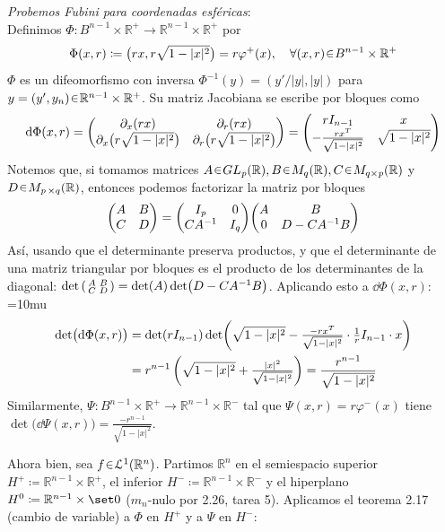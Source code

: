\begin{sol}
\vspace{1em}
\noindent\emph{Probemos Fubini para coordenadas esféricas}:\\
Definimos \(\Phi: B^{n-1} \times \mathbb{R}^+ \to \mathbb{R}^{n-1}\times\mathbb{R}^+\) por
\[
\Phi(x,r) \coloneq \bigl(rx, r\sqrt{1-|x|^2}\bigr) = r\varphi^+(x), \quad \forall (x,r) \en B^{n-1}\times\mathbb{R}^+
\]
\(\Phi\) es un difeomorfismo con inversa \(\Phi^{-1}(y) = (y'/|y|, |y|)\) para \(y=(y',y_n) \en \mathbb{R}^{n-1}\times\mathbb{R}^+\). 
Su matriz Jacobiana se escribe por bloques como
\[
\dd{\Phi(x,r)}
= \mqty(\partial_x(rx) & \partial_r(rx) \\ \partial_x\bigl(r\sqrt{1-|x|^2}\bigr) & \partial_r\bigl(r\sqrt{1-|x|^2}\bigr))
= \mqty(
r I_{n-1} & x \\
-\frac{r x^T}{\sqrt{1-|x|^2}} & \sqrt{1-|x|^2}
)
\]
Notemos que, si tomamos matrices $A\en GL_{\p}(\mathbb{R}), B\en M_{q}(\mathbb{R}), C \en M_{q \times\p}(\mathbb{R})$ y $D\en M_{\p\times q}(\mathbb{R})$, entonces podemos factorizar la matriz por bloques 
\[
\mqty(A&B\\C&D)%
= \mqty(I_{\p}&0\\CA^{-1}&I_q) \mqty(A&B\\0&D-CA^{-1}B)
\]
Así, usando que el determinante preserva productos, y que el determinante de una matriz triangular por bloques es el producto de los determinantes de la diagonal: $\det\smqty(A&B\\C&D) = \det(A)\det(D-CA^{-1}B)$. Aplicando esto a $\dd{\Phi(x,r)}$:
{\thickmuskip=10mu
\begin{align*}
\det\bigl(\dd{\Phi(x,r)}\bigr)
&= \det(rI_{n-1})\det(\sqrt{1-|x|^2} - \tfrac{-r x^T}{\sqrt{1-|x|^2}}\cdot\tfrac{1}{r}I_{n-1}\cdot x)\\
&= r^{n-1}\left(\sqrt{1-|x|^2} + \tfrac{\abs{x}^2}{\sqrt{1-|x|^2}}\right)
= \frac{r^{n-1}}{\sqrt{1-|x|^2}}
\end{align*}
}%
Similarmente, $\Psi \colon B^{n-1}\times\mathbb{R}^+ \to \mathbb{R}^{n-1}\times\mathbb{R}^-$ tal que $\Psi(x,r) = r\varphi^-(x)$ tiene $\det\bigl(\dd{\Psi(x,r)}\bigr) = \frac{-r^{n-1}}{\sqrt{1-|x|^2}}$.
\par
Ahora bien, sea \(f \en \mathcal{L}^1(\mathbb{R}^n)\). Partimos \(\mathbb{R}^n\) en el semiespacio superior \(H^+ \coloneq \mathbb{R}^{n-1}\times\mathbb{R}^+\), el inferior \(H^- \coloneq \mathbb{R}^{n-1}\times\mathbb{R}^-\) y el hiperplano \(H^0\coloneq \mathbb{R}^{n-1}\times\set0\) (\(m_n\)-nulo por 2.26, tarea 5). Aplicamos el teorema 2.17 (cambio de variable) a \(\Phi\) en \(H^+\) y a \(\Psi\) en \(H^-\):

\end{sol}
